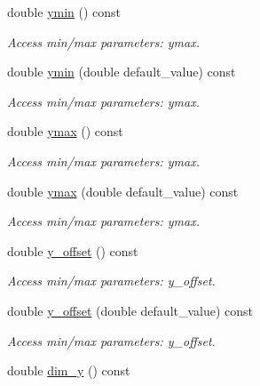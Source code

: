 \begin{DoxyCompactItemize}
double \hyperlink{struct_d_d4hep_1_1_x_m_l_1_1_dimension_a6fb066a6e4f74be4a817a7698104e8aa}{ymin} () const 
\begin{DoxyCompactList}\small\item\em Access min/max parameters: ymax. \item\end{DoxyCompactList}\item 
double \hyperlink{struct_d_d4hep_1_1_x_m_l_1_1_dimension_a29799f2d4ebe2806dce1c7eebefbf23b}{ymin} (double default\_\-value) const 
\begin{DoxyCompactList}\small\item\em Access min/max parameters: ymax. \item\end{DoxyCompactList}\item 
double \hyperlink{struct_d_d4hep_1_1_x_m_l_1_1_dimension_a4cabc81bbdf7cf185ad26499e497d7de}{ymax} () const 
\begin{DoxyCompactList}\small\item\em Access min/max parameters: ymax. \item\end{DoxyCompactList}\item 
double \hyperlink{struct_d_d4hep_1_1_x_m_l_1_1_dimension_a52fba9090a56b6d166234fc4ff483ea2}{ymax} (double default\_\-value) const 
\begin{DoxyCompactList}\small\item\em Access min/max parameters: ymax. \item\end{DoxyCompactList}\item 
double \hyperlink{struct_d_d4hep_1_1_x_m_l_1_1_dimension_afc932cda1e98c7143e9837e9098884e4}{y\_\-offset} () const 
\begin{DoxyCompactList}\small\item\em Access min/max parameters: y\_\-offset. \item\end{DoxyCompactList}\item 
double \hyperlink{struct_d_d4hep_1_1_x_m_l_1_1_dimension_a8a60f801518f3ba26ee1e81b623751f1}{y\_\-offset} (double default\_\-value) const 
\begin{DoxyCompactList}\small\item\em Access min/max parameters: y\_\-offset. \item\end{DoxyCompactList}\item 
double \hyperlink{struct_d_d4hep_1_1_x_m_l_1_1_dimension_a3fd03ae8bb045a971ac545650ea123bf}{dim\_\-y} () const 

\end{DoxyCompactItemize}
